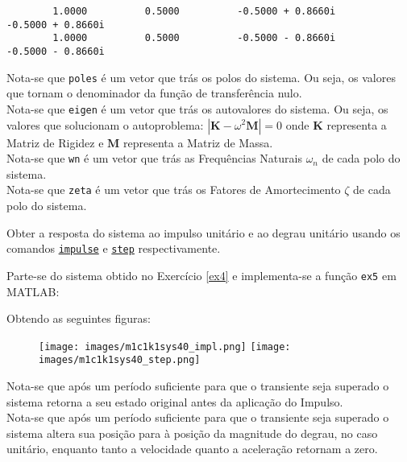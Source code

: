 \documentclass{article}
\begin{document}
\begin{resolution}
\begin{scriptsize}
\begin{lstlisting}
        1.0000          0.5000          -0.5000 + 0.8660i               -0.5000 + 0.8660i
        1.0000          0.5000          -0.5000 - 0.8660i               -0.5000 - 0.8660i
        \end{lstlisting}
    \end{scriptsize}
    Nota-se que \texttt{poles} é um vetor que trás os polos do sistema. Ou seja, os valores que tornam o denominador da função de transferência nulo.\\
    
    Nota-se que \texttt{eigen} é um vetor que trás os autovalores do sistema. Ou seja, os valores que solucionam o autoproblema: $|\mathbf{K} - \omega^2\mathbf{M}| = 0$ onde $\mathbf{K}$ representa a Matriz de Rigidez e $\mathbf{M}$ representa a Matriz de Massa.\\

    Nota-se que \texttt{wn} é um vetor que trás as Frequências Naturais $\omega_{n}$ de cada polo do sistema.\\

    Nota-se que \texttt{zeta} é um vetor que trás os Fatores de Amortecimento $\zeta$ de cada polo do sistema.
\end{resolution}

\newpage\begin{exercise}\label{ex5}
    Obter a resposta do sistema ao impulso unitário e ao degrau unitário usando os comandos \href{https://www.mathworks.com/help/control/ref/lti.impulse.html}{\texttt{impulse}} e \href{https://www.mathworks.com/help/control/ref/lti.step.html}{\texttt{step}} respectivamente.
\end{exercise}
\begin{resolution}
    Parte-se do sistema obtido no Exercício \ref{ex4} e implementa-se a função \texttt{ex5} em MATLAB:
    \begin{scriptsize}
        \myMatlab
    \end{scriptsize}
    Obtendo as seguintes figuras:
    \begin{figure}[H]
        \centering
        \texttt{[image: images/m1c1k1sys40\_impl.png]}
        \texttt{[image: images/m1c1k1sys40\_step.png]}
    \end{figure}
    Nota-se que após um período suficiente para que o transiente seja superado o sistema retorna a seu estado original antes da aplicação do Impulso.\\

    Nota-se que após um período suficiente para que o transiente seja superado o sistema altera sua posição para à posição da magnitude do degrau, no caso unitário, enquanto tanto a velocidade quanto a aceleração retornam a zero.
\end{resolution}
\end{document}
